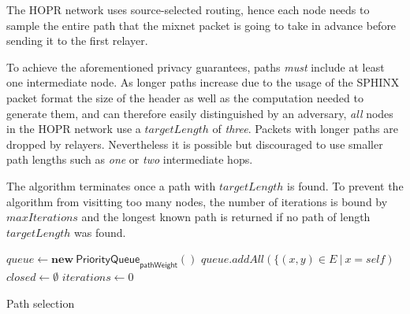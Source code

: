 The HOPR network uses source-selected routing, hence each node needs to sample the entire path that the mixnet packet is going to take in advance before sending it to the first relayer.

To achieve the aforementioned privacy guarantees, paths \textit{must} include at least one intermediate node. As longer paths increase due to the usage of the SPHINX packet format the size of the header as well as the computation needed to generate them, and can therefore easily distinguished by an adversary, \textit{all} nodes in the HOPR network use a $targetLength$ of \textit{three}. Packets with longer paths are dropped by relayers. Nevertheless it is possible but discouraged to use smaller path lengths such as \textit{one} or \textit{two} intermediate hops.

The algorithm terminates once a path with $targetLength$ is found. To prevent the algorithm from visitting too many nodes, the number of iterations is bound by $maxIterations$ and the longest known path is returned if no path of length $targetLength$ was found.

\begin{algorithm}[H]
    \SetAlgoNoLine
    \DontPrintSemicolon
    \;
    $queue \leftarrow \mathbf{new} \ \mathsf{PriorityQueue}_{\textsf{pathWeight}}()$\;
    $queue.addAll(\{ (x,y) \in E \ | \ x = self)$\;
    $closed \leftarrow \emptyset$\;
    $iterations \leftarrow 0$\;
    \;
    \caption{Path selection}
\end{algorithm}